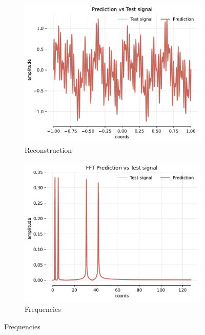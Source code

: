 \begin{figure}[h]
    \centering
    \begin{subfigure}[b]{0.4\textwidth}
        \centering
        \includegraphics[width=\textwidth]{img/ch3/prediction_1hl_64hf_w10.pdf}
        \caption{Reconstruction}
        \label{fig:rec-freqs-1hl}
    \end{subfigure}
    \begin{subfigure}[b]{0.4\textwidth}
        \centering
        \includegraphics[width=\textwidth]{img/ch3/fft_1hl_64hf_w10.pdf}
        \caption{Frequencies}
        \label{fig:fft-freqs-1hl}
    \end{subfigure}
    

\end{figure}
